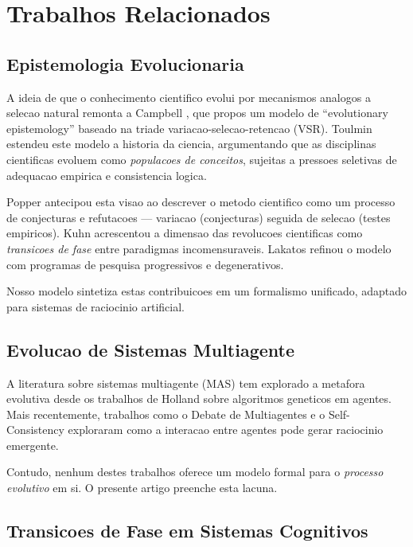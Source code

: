 \documentclass[5p]{elsarticle}
\begin{document}
\section{Trabalhos Relacionados}

\subsection{Epistemologia Evolucionaria}

A ideia de que o conhecimento cientifico evolui por mecanismos analogos a
selecao natural remonta a Campbell \cite{campbell1960}, que propos um modelo
de ``evolutionary epistemology'' baseado na triade variacao-selecao-retencao
(VSR). Toulmin \cite{toulmin1972} estendeu este modelo a historia da ciencia,
argumentando que as disciplinas cientificas evoluem como \textit{populacoes
de conceitos}, sujeitas a pressoes seletivas de adequacao empirica e
consistencia logica.

Popper \cite{popper1959} antecipou esta visao ao descrever o metodo cientifico
como um processo de conjecturas e refutacoes --- variacao (conjecturas) seguida
de selecao (testes empiricos). Kuhn \cite{kuhn1962} acrescentou a dimensao
das revolucoes cientificas como \textit{transicoes de fase} entre paradigmas
incomensuraveis. Lakatos \cite{lakatos1976} refinou o modelo com programas de
pesquisa progressivos e degenerativos.

Nosso modelo sintetiza estas contribuicoes em um formalismo unificado,
adaptado para sistemas de raciocinio artificial.

\subsection{Evolucao de Sistemas Multiagente}

A literatura sobre sistemas multiagente (MAS) tem explorado a metafora
evolutiva desde os trabalhos de Holland \cite{holland1992} sobre algoritmos
geneticos em agentes. Mais recentemente, trabalhos como o Debate de
Multiagentes \cite{liang2023} e o Self-Consistency \cite{wang2023} exploraram
como a interacao entre agentes pode gerar raciocinio emergente.

Contudo, nenhum destes trabalhos oferece um modelo formal para o \textit{processo
evolutivo} em si. O presente artigo preenche esta lacuna.

\subsection{Transicoes de Fase em Sistemas Cognitivos}
\end{document}

